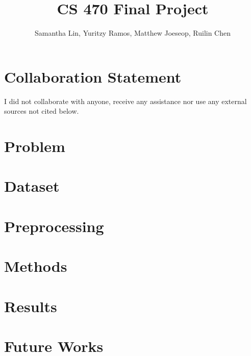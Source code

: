 \documentclass{article}
\title{CS 470 Final Project}
\author{Samantha Lin, Yuritzy Ramos, Matthew Joeseop, Ruilin Chen}
\begin{document}
\maketitle

\section{Collaboration Statement}
I did not collaborate with anyone, receive any assistance nor use any external sources not cited below.

\section{Problem}

\section{Dataset}

\section{Preprocessing}

\section{Methods}

\section{Results}

\section{Future Works}
\end{document}
